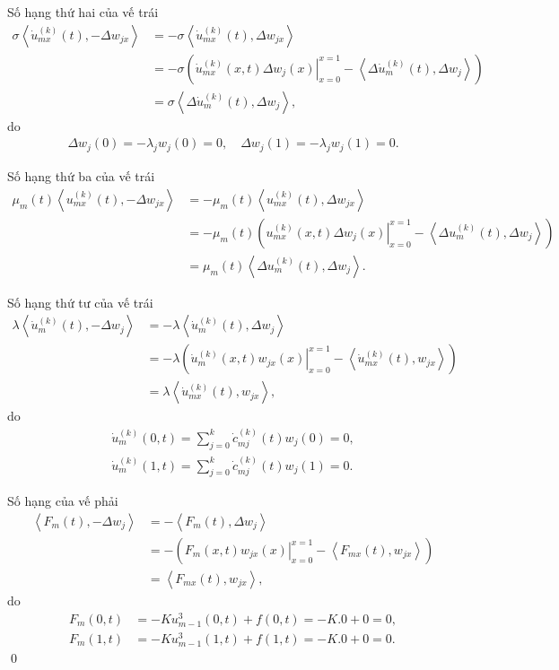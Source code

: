 \documentclass[12pt,a4paper]{article}
\theoremstyle{definition}
\begin{document}
Số hạng thứ hai của vế trái
\begin{align*}
    \sigma \left<\dot{u}_{mx}^{(k)}(t), -\Delta w_{jx}\right>
    &= -\sigma \left<\dot{u}_{mx}^{(k)}(t), \Delta w_{jx}\right> \\
    &= -\sigma \left(\left.\dot{u}_{mx}^{(k)}(x,t) \Delta w_j(x)\right|_{x=0}^{x=1} - \left<\Delta\dot{u}_m^{(k)}(t), \Delta w_j\right>\right) \\
    &= \sigma \left<\Delta\dot{u}_m^{(k)}(t), \Delta w_j\right>,
\end{align*}
do
\begin{align*}
    \Delta w_j(0) = -\lambda_j w_j(0) = 0, \quad \Delta w_j(1) = -\lambda_j w_j(1) = 0.
\end{align*}

Số hạng thứ ba của vế trái
\begin{align*}
    \mu_m(t) \left<u_{mx}^{(k)}(t), -\Delta w_{jx}\right>
    &= -\mu_m(t) \left<u_{mx}^{(k)}(t), \Delta w_{jx}\right> \\
    &= -\mu_m(t) \left(\left.u_{mx}^{(k)}(x,t) \Delta w_j(x)\right|_{x=0}^{x=1} - \left<\Delta u_m^{(k)}(t), \Delta w_j\right>\right) \\
    &= \mu_m(t) \left<\Delta u_m^{(k)}(t), \Delta w_j\right>.
\end{align*}

Số hạng thứ tư của vế trái
\begin{align*}
    \lambda \left<\dot{u}_m^{(k)}(t), -\Delta w_j\right>
    &= -\lambda \left<\dot{u}_m^{(k)}(t), \Delta w_j\right> \\
    &=  -\lambda \left(\left.\dot{u}_m^{(k)}(x,t) w_{jx}(x)\right|_{x=0}^{x=1} - \left<\dot{u}_{mx}^{(k)}(t), w_{jx}\right>\right) \\
    &= \lambda \left<\dot{u}_{mx}^{(k)}(t), w_{jx}\right>,
\end{align*}
do
\begin{align*}
    \dot{u}_m^{(k)}(0,t) = \sum_{j=0}^k \dot{c}_{mj}^{(k)}(t) w_j(0) = 0, \\
    \dot{u}_m^{(k)}(1,t) = \sum_{j=0}^k \dot{c}_{mj}^{(k)}(t) w_j(1) = 0.
\end{align*}

Số hạng của vế phải
\begin{align*}
    \left<F_m(t), -\Delta w_j\right>
    &= - \left<F_m(t), \Delta w_j\right> \\
    &= -\left(\left.F_m(x,t) w_{jx}(x)\right|_{x=0}^{x=1} - \left<F_{mx}(t), w_{jx}\right>\right) \\
    &= \left<F_{mx}(t), w_{jx}\right>,
\end{align*}
do
\begin{align*}
    F_m(0,t) &= -K u^3_{m-1}(0,t) + f(0,t) = -K.0 + 0 = 0, \\
    F_m(1,t) &= -K u^3_{m-1}(1,t) + f(1,t) = -K.0 + 0 = 0.
\end{align*} \qed
\end{document}
